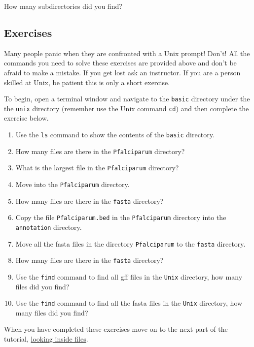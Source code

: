\documentclass[11pt]{article}
\providecommand{\tightlist}{%
      \setlength{\itemsep}{0pt}\setlength{\parskip}{0pt}}
\begin{document}
    How many subdirectories did you find?

    \hypertarget{exercises}{%
\subsection{Exercises}\label{exercises}}

Many people panic when they are confronted with a Unix prompt! Don't!
All the commands you need to solve these exercises are provided above
and don't be afraid to make a mistake. If you get lost ask an
instructor. If you are a person skilled at Unix, be patient this is only
a short exercise.

To begin, open a terminal window and navigate to the \texttt{basic}
directory under the the \texttt{unix} directory (remember use the Unix
command \texttt{cd}) and then complete the exercise below.

\begin{enumerate}
\def\labelenumi{\arabic{enumi}.}
\tightlist
\item
  Use the \texttt{ls} command to show the contents of the \texttt{basic}
  directory.
\item
  How many files are there in the \texttt{Pfalciparum} directory?
\item
  What is the largest file in the \texttt{Pfalciparum} directory?
\item
  Move into the \texttt{Pfalciparum} directory.
\item
  How many files are there in the \texttt{fasta} directory?
\item
  Copy the file \texttt{Pfalciparum.bed} in the \texttt{Pfalciparum}
  directory into the \texttt{annotation} directory.
\item
  Move all the fasta files in the directory \texttt{Pfalciparum} to the
  \texttt{fasta} directory.
\item
  How many files are there in the \texttt{fasta} directory?
\item
  Use the \texttt{find} command to find all gff files in the
  \texttt{Unix} directory, how many files did you find?
\item
  Use the \texttt{find} command to find all the fasta files in the
  \texttt{Unix} directory, how many files did you find?
\end{enumerate}

    When you have completed these exercises move on to the next part of the
tutorial, \href{files.ipynb}{looking inside files}.
\end{document}
